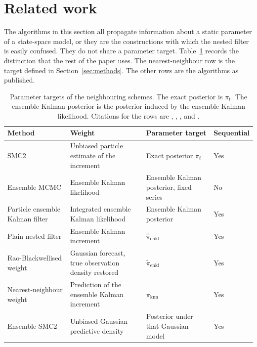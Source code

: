 \section{Related work}
\label{sec:related}

The algorithms in this section all propagate information about a static parameter of a state-space model, or they are the constructions with which the nested filter is easily confused. They do not share a parameter target. Table~\ref{tab:targets} records the distinction that the rest of the paper uses. The nearest-neighbour row is the target defined in Section~\ref{sec:methods}. The other rows are the algorithms as published.

\begin{table}[htbp]
\centering
\caption{Parameter targets of the neighbouring schemes. The exact posterior is \(\pi_t\). The ensemble Kalman posterior is the posterior induced by the ensemble Kalman likelihood. Citations for the rows are \citet{chopin2012}, \citet{drovandi2022}, \citet{katzfuss2018}, \citet{golightly2026} and \citet{temfack2026}.}
\label{tab:targets}
\small
\begin{tabular}{>{\raggedright\arraybackslash}p{3.15cm}>{\raggedright\arraybackslash}p{4.15cm}>{\raggedright\arraybackslash}p{4.35cm}>{\raggedright\arraybackslash}p{1.7cm}}
\toprule
Method & Weight & Parameter target & Sequential \\
\midrule
SMC2 & Unbiased particle estimate of the increment & Exact posterior \(\pi_t\) & Yes \\
Ensemble MCMC & Ensemble Kalman likelihood & Ensemble Kalman posterior, fixed series & No \\
Particle ensemble Kalman filter & Integrated ensemble Kalman likelihood & Ensemble Kalman posterior & Yes \\
Plain nested filter & Ensemble Kalman increment & \(\hat{\pi}_{\mathrm{enkf}}\) & Yes \\
Rao-Blackwellised weight & Gaussian forecast, true observation density restored & \(\tilde{\pi}_{\mathrm{enkf}}\) & Yes \\
Nearest-neighbour weight & Prediction of the ensemble Kalman increment & \(\pi_{\mathrm{knn}}\) & Yes \\
Ensemble SMC2 & Unbiased Gaussian predictive density & Posterior under that Gaussian model & Yes \\
\bottomrule
\end{tabular}
\end{table}

